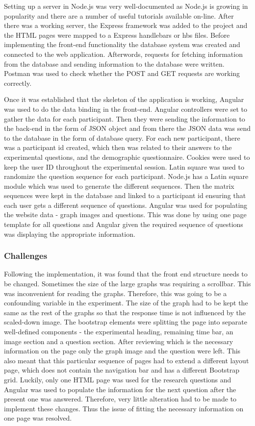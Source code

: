 \documentclass{l4proj}
\begin{document}
Setting up a server in Node.js was very well-documented as Node.js is growing in popularity and there are a number of useful tutorials available on-line. After there was a working server, the Express framework was added to the project and the HTML pages were mapped to a Express handlebars or hbs files. Before implementing the front-end functionality the database system was created and connected to the web application. Afterwords, requests for fetching information from the database and sending information to the database were written. Postman was used to check whether the POST and GET requests are working correctly. 

Once it was established that the skeleton of the application is working, Angular was used to do the data binding in the front-end. Angular controllers were set to gather the data for each participant. Then they were sending the information to the back-end in the form of JSON object and from there the JSON data was send to the database in the form of database query. For each new participant, there was a participant id created, which then was related to their answers to the experimental questions, and the demographic questionnaire. Cookies were used to keep the user ID throughout the experimental session. Latin square was used to randomize the question sequence for each participant. Node.js has a Latin square module which was used to generate the different sequences. Then the matrix sequences were kept in the database and linked to a participant id ensuring that each user gets a different sequence of questions. Angular was used for populating the website data - graph images and questions. This was done by using one page template for all questions and Angular given the required sequence of questions was displaying the appropriate information. 

\subsubsection{Challenges}

Following the implementation, it was found that the front end structure needs to be changed. Sometimes the size of the large graphs was requiring a scrollbar. This was inconvenient for reading the graphs. Therefore, this was going to be a confounding variable in the experiment. The size of  the graph had to be kept the same as the rest of the graphs so that the response time is not influenced by the scaled-down image. The bootstrap elements were splitting the page into separate well-defined components - the experimental heading, remaining time bar, an image section and a question section. After reviewing which is the necessary information on the page only the graph image and the question were left. This also meant that this particular sequence of pages had to extend a different layout page, which does not contain the navigation bar and has a different Bootstrap grid. Luckily, only one HTML page was used for the research questions and Angular was used to populate the information for the next question after the present one was answered. Therefore, very little alteration had to be made to implement these changes. Thus the issue of fitting the necessary information on one page was resolved.
\end{document}
